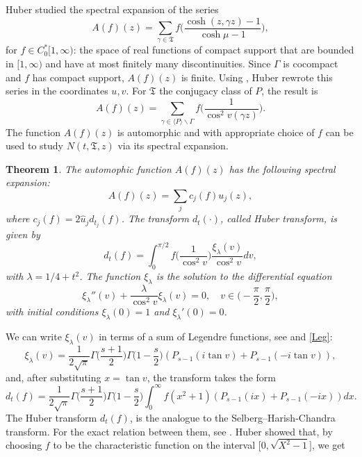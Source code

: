 \documentclass[a4paper,11pt]{amsart}
\newtheorem{theorem}{Theorem}[section]
\theoremstyle{definition}
\begin{document}
Huber \cite[p. 16, Eq. 4]{Hu98} studied the spectral expansion of the series
$$A(f)(z)=\sum_{\gamma \in \mathfrak{T}}f\Bigg(\frac{\cosh(z,\gamma z)-1}{\cosh \mu -1}\Bigg),$$
for $f\in C_0^{*}[1,\infty)$: the space of real functions of
compact support that are bounded in $[1,\infty)$ and have at most finitely many discontinuities. Since $\Gamma$ is cocompact and $f$ has compact support, $A(f)(z)$ is finite.
Using \cite[p.~20, Eq. 26]{Hu98}, Huber rewrote this series in the coordinates $u,v$. For $\mathfrak{T}$ the conjugacy class of $P$, the result is
\begin{equation}\label{Afz}
A(f)(z)=\sum_{\gamma \in \langle P \rangle \backslash \Gamma}f\Big(\frac{1}{\cos ^2v(\gamma z)}\Big).
\end{equation}
The function $A(f)(z)$ is automorphic and with appropriate choice of $f$ can be used to study $N(t,\mathfrak{T},z)$ via its spectral expansion.
\begin{theorem}\label{hub}\rm \cite[17]{Hu98}
The automophic function $A(f)(z)$ has the following spectral expansion:
$$A(f)(z)= \sum_{j}c_j(f)u_j(z),$$
where $c_j(f)=2\hat{u}_jd_{t_j}(f)$. The transform $d_t(\cdot)$, called Huber transform, is given by
\begin{equation}\label{df}
    d_{t}(f)= \int_{0}^{\pi/2}f\Big(\frac{1}{\cos^2v}\Big)\frac{\xi_{\lambda}(v)}{\cos^2v}dv,
\end{equation}
with $\lambda=1/4+t^2$.
The function $\xi_{\lambda}$ is the solution to the differential equation
$$\xi_{\lambda}''(v)+\frac{\lambda}{\cos^2v}\xi_{\lambda}(v)=0,\quad  v\in \Big(-\frac{\pi}{2},\frac{\pi}{2}\Big),$$
with initial conditions $\xi_{\lambda}(0)=1$ and $\xi_{\lambda}'(0)=0$.
\end{theorem}
We can write $\xi_{\lambda}(v)$ in terms of a sum of Legendre functions, see \cite[p. 5]{CP} and \eqref{Leg}:
$$ \xi_{\lambda}(v)= \frac{1}{2\sqrt{\pi}}\Gamma\Big(\frac{s+1}{2}\Big)\Gamma\Big(1-\frac{s}{2}\Big)(P_{s-1}(i\tan v)+P_{s-1}(-i\tan v)),$$ and, after substituting $x=\tan v$, the transform takes the form
\begin{equation}\label{d(f)}
d_t(f)= \frac{1}{2\sqrt{\pi}}\Gamma\Big(\frac{s+1}{2}\Big)\Gamma\Big(1-\frac{s}{2}\Big) \int_0^{\infty} f(x^2+1)(P_{s-1}(ix)+P_{s-1}(-ix))dx.
\end{equation}
The Huber transform $d_{t}(f)$, is the analogue to the Selberg--Harish-Chandra transform. For the exact relation between them, see \cite{Lsieve}.
Huber showed that, by choosing $f$ to be the characteristic function on the interval $\Big[0,\sqrt{X^2-1}\Big]$, we get 
\end{document}
